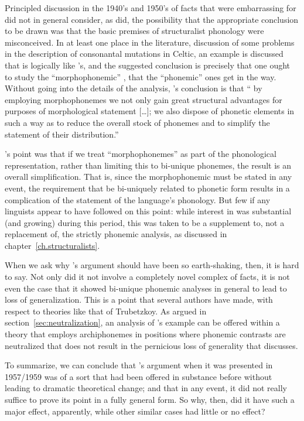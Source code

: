 Principled discussion in the 1940's and 1950's of facts that were
embarrassing for  did not in general consider, as {\Halle}
did, the possibility that the appropriate conclusion to be drawn was
that the basic premises of structuralist phonology were misconceived.
In at least one place in the literature, 
discussion of some problems in the description of consonantal
mutations in Celtic, an example is discussed that is logically like
{\Halle}'s, and the suggested conclusion is precisely that one ought to
study the ``morphophonemic'' , that the ``phonemic''
ones get in the way. Without going into the details of the analysis,
{\Hamp}'s conclusion is that `` by employing morphophonemes we not only
gain great structural advantages for purposes of morphological
statement {[\ldots]}; we also dispose of phonetic elements in such a
way as to reduce the overall stock of phonemes and to simplify the
statement of their distribution.''
  
{\Hamp}'s point was that if we treat ``morphophonemes'' as part of the
phonological representation, rather than limiting this to bi-unique
phonemes, the result is an overall simplification. That is, since the
morphophonemic  must be stated in any event, the
requirement that  be bi-uniquely related
to phonetic form results in a complication of the statement of the
language's phonology.  But few if any linguists appear to have
followed {\Hamp} on this point: while interest in  was
substantial (and growing) during this period, this was taken to be a
supplement to, not a replacement of, the strictly phonemic analysis,
as discussed in chapter~\ref{ch.structuralists}.
  
When we ask why {\Halle}'s argument should have been so earth-shaking,
then, it is hard to say. Not only did it not involve a completely
novel complex of facts, it is not even the case that it showed
bi-unique phonemic analyses in general to lead to loss of
generalization. This is a point that several authors have made, with
respect to theories like that of Trubetzkoy. As argued in
section~\ref{sec:neutralization}, an
analysis of {\Halle}'s  example can be offered within a theory
that employs archiphonemes in positions where phonemic contrasts are
neutralized that does not result in the pernicious loss of generality
that {\Halle} discusses.
  
To summarize, we can conclude that {\Halle}'s
argument when it was presented in 1957/1959 was of a sort that had
been offered in substance before without leading to dramatic
theoretical change; and that in any event, it did not
really suffice to prove its point in a fully general form.  So why,
then, did it have such a major effect, apparently, while other similar
cases had little or no effect?
  

